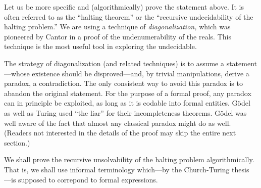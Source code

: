 Let us be more specific and (algorithmically) prove the statement above.
It is often referred to as the ``halting theorem''  or the  ``recursive
undecidability of the halting problem.''
We are using a technique of {\em diagonalization,} which was pioneered
by Cantor in a proof of the undenumerability of the reals.
This technique is the most useful tool in exploring the undecidable.

The strategy of diagonalization (and related techniques) is to assume a
statement---whose
existence should be disproved---and, by trivial manipulations, derive a
paradox, a contradiction. The only consistent way to avoid this
paradox
is to abandon the original statement. For the purpose of a formal proof,
any paradox can in
principle be exploited, as long as it is codable into formal entities.
G\"odel \cite{godel1} as well as Turing \cite{turing} used ``the liar''
\cite{bible}
for their incompleteness theorems.
G\"odel was well aware of the fact that almost any
classical paradox might do as well.
(Readers not interested
in the details of the proof may skip the entire next section.)

We shall prove the recursive unsolvability of the halting problem
algorithmically. That is, we shall use informal terminology which---by
the Church-Turing thesis \cite{rogers1,odi:89}---is supposed to
correpond to formal expressions.

